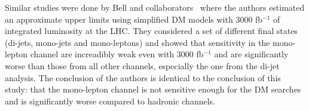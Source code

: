 % 

Similar studies were done by Bell and collaborators~\cite{arXiv:1512.00476} where the authors estimated an approximate upper limits using simplified DM models with 3000 fb$^{-1}$ of integrated luminosity at the LHC. 
They considered a set of different final states (di-jets, mono-jets and mono-leptons)
and showed that 
sensitivity 
in the mono-lepton channel are increadibly weak even with 3000 fb$^{-1}$ and are significantly worse than those from all other channels, especially the one from the di-jet analysis. 
The conclusion of the authors is identical to the conclusion of this study: that the mono-lepton channel is not sensitive enough for the DM searches and is significantly worse compared to hadronic channels.




%
